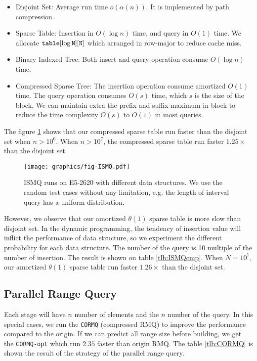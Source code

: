 \begin{itemize}
  \item 

Disjoint Set: Average run time $o(\alpha(n))$.  It is implemented by
path compression.

  \item 

Sparse Table: Insertion in $O(\log n)$ time, and query in $O(1)$ time.
We allocate $\tt{table}[\log N][N]$ which arranged in row-major to
reduce cache miss.

  \item 

Binary Indexed Tree: Both insert and query operation consume $O(\log
n)$ time.

  \item 

Compressed Sparse Tree: The insertion operation consume amortized
$O(1)$ time.  The query operation consumes $O(s)$ time, which $s$ is
the size of the block.  We can maintain extra the prefix and suffix
maximum in block to reduce the time complexity $O(s)$ to $O(1)$ in
most queries.

\end{itemize}

The figure \ref{fig:fig-ISMQcmp} shows that our compressed sparse
table run faster than the disjoint set when $n > 10^6$.  When $n >
10^7$, the compressed sparse table run faster $1.25 \times$ than the
disjoint set.  

\begin{figure}[!thb]
  \centering
  \texttt{[image: graphics/fig-ISMQ.pdf]}
  \caption{ISMQ runs on E5-2620 with different data structures. We use the random test cases without any limitation, e.g. the length of interval query has a uniform distribution.}
  \label{fig:fig-ISMQcmp}
\end{figure}

However, we observe that our amortized $\theta(1)$ sparse table is
more slow than disjoint set.  In the dynamic programming, the tendency
of insertion value will inflict the performance of data structure, so
we experiment the different probability for each data structure.  The
number of the query is 10 multiple of the number of insertion.  The
result is shown on table \ref{tlb:ISMQcmp}.  When $N=10^7$, our
amortized $\theta(1)$ sparse table run faster $1.26 \times$ than the
disjoint set.



\subsection{Parallel Range Query}

Each stage will have $n$ number of elements and the $n$ number of the
query.  In this special cases, we run the \texttt{CORMQ} (compressed
RMQ) to improve the performance compared to the origin.  If we can
predict all range size before building, we get the \texttt{CORMQ-opt}
which run $2.35$ faster than origin RMQ.  The table \ref{tlb:CORMQ} is
shown the result of the strategy of the parallel range query.

